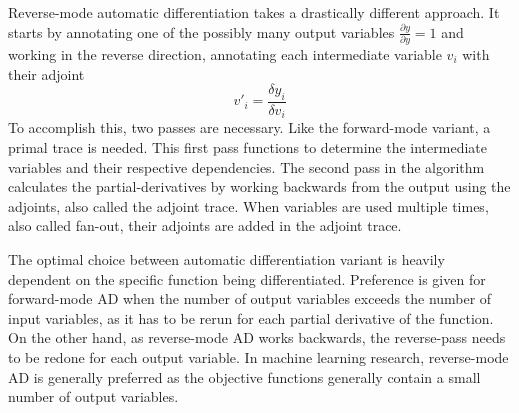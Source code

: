 Reverse-mode automatic differentiation takes a drastically different approach.
It starts by annotating one of the possibly many output variables $\frac{\partial{y}}{\partial{y}} = 1$ and working in the reverse direction, annotating each intermediate variable $v_i$ with their adjoint
$$v'_i=\frac{\delta y_i}{\delta v_i}$$
To accomplish this, two passes are necessary.
Like the forward-mode variant, a primal trace is needed.
This first pass functions to determine the intermediate variables and their respective dependencies.
The second pass in the algorithm calculates the partial-derivatives by working backwards from the output using the adjoints, also called the adjoint trace.
When variables are used multiple times, also called fan-out, their adjoints are added in the adjoint trace.

The optimal choice between automatic differentiation variant is heavily dependent on the specific function being differentiated.
Preference is given for forward-mode AD when the number of output variables exceeds the number of input variables, as it has to be rerun for each partial derivative of the function.
On the other hand, as reverse-mode AD works backwards, the reverse-pass needs to be redone for each output variable.
In machine learning research, reverse-mode AD is generally preferred as the objective functions generally contain a small number of output variables.


